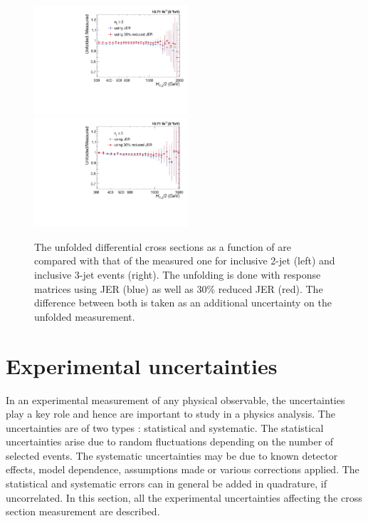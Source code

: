 \begin{figure}[!htp]
 \begin{center}
 \includegraphics[width=0.51\textwidth]{Plots_HT_2_150/Ratio_Unfolding_data_NLO_2.pdf}%
 ~~\includegraphics[width=0.51\textwidth]{Plots_HT_2_150/Ratio_Unfolding_data_NLO_3.pdf}
 \caption{The unfolded differential cross sections as a function of \httwo are compared with that of the measured one for inclusive 2-jet (left) and inclusive 3-jet events (right). The unfolding is done with response matrices using JER (blue) as well as 30\% reduced JER (red). The difference between both is taken as an additional uncertainty on the unfolded measurement.}
 \label{fig:unfolded_data}
 \end{center}
\end{figure}

\section{Experimental uncertainties}
\label{sec:exp_unc}
In an experimental measurement of any physical observable, the uncertainties play a key role and hence are important to study in a physics analysis. The uncertainties are of two types : statistical and systematic. The statistical uncertainties arise due to random fluctuations depending on the number of selected events. The systematic uncertainties may be due to known detector effects, model dependence, assumptions
made or various corrections applied. The statistical and systematic errors can in general be added in quadrature, if uncorrelated. In this section, all the experimental uncertainties affecting the cross section measurement are described.

